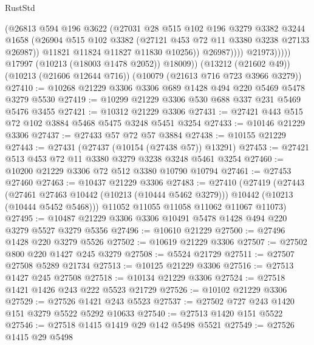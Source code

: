 \begin{lexlean}{RustStd}
\begin{coremodule}
                          (@26813
                            @594
                            @196
                            @3622
                            (@27031
                              @28
                              @515
                              @102
                              @196
                              @3279
                              @3382
                              @3244
                              @1658
                              (@26904
                                @515
                                @102
                                @3382
                                (@27121 @453 @72 @11 @3380 @3238 @27133 @26987))
                              @11821
                              @11824
                              @11827
                              @11830
                              @10256))
                          @26987))))
                  @21973)))))
        @17997
        (@10213 (@18003 @1478 @2052))
        @18009))
    (@13212 (@21602 @49))
    (@10213 (@21606 @12644 @716))
    (@10079 (@21613 @716 @723 @3966 @3279))
@27410 := @10268 @21229 @3306 @3306 @689 @1428 @494 @220 @5469 @5478 @3279 @5530
@27419 := @10299 @21229 @3306 @530 @688 @337 @231 @5469 @5476 @3455
@27421 := @10312 @21229 @3306
@27431 := @27421 @443 @515 @72 @102 @3884 @5468 @5475 @3248 @5451 @3254
@27433 := @10146 @21229 @3306
@27437 := @27433 @57 @72 @57 @3884
@27438 := @10155 @21229
@27443 := @27431 (@27437 (@10154 (@27438 @57)) @13291)
@27453 := @27421 @513 @453 @72 @11 @3380 @3279 @3238 @3248 @5461 @3254
@27460 := @10200 @21229 @3306 @72 @512 @3380 @10790 @10794
@27461 := @27453 @27460
@27463 := @10437 @21229 @3306
@27483 := @27410
    (@27419
      (@27443
        (@27461 @27463 @10442 (@10213 (@10444 @5462 @3279)))
        @10442
        (@10213 (@10444 @5452 @5468)))
      @11052
      @11055
      @11058
      @11062
      @11067
      @11073)
@27495 := @10487 @21229 @3306 @3306 @10491 @5478 @1428 @494 @220 @3279 @5527 @3279 @5356
@27496 := @10610 @21229
@27500 := @27496 @1428 @220 @3279 @5526
@27502 := @10619 @21229 @3306
@27507 := @27502 @800 @220 @1427 @245 @3279
@27508 := @5524 @21729
@27511 := @27507 @27508 @5289 @21734
@27513 := @10125 @21229 @3306
@27516 := @27513 @1427 @245 @27508
@27518 := @10134 @21229 @3306
@27524 := @27518 @1421 @1426 @243 @222 @5523 @21729
@27526 := @10102 @21229 @3306
@27529 := @27526 @1421 @243 @5523
@27537 := @27502 @727 @243 @1420 @151 @3279 @5522 @5292 @10633
@27540 := @27513 @1420 @151 @5522
@27546 := @27518 @1415 @1419 @29 @142 @5498 @5521
@27549 := @27526 @1415 @29 @5498

\end{coremodule}
\end{lexlean}
